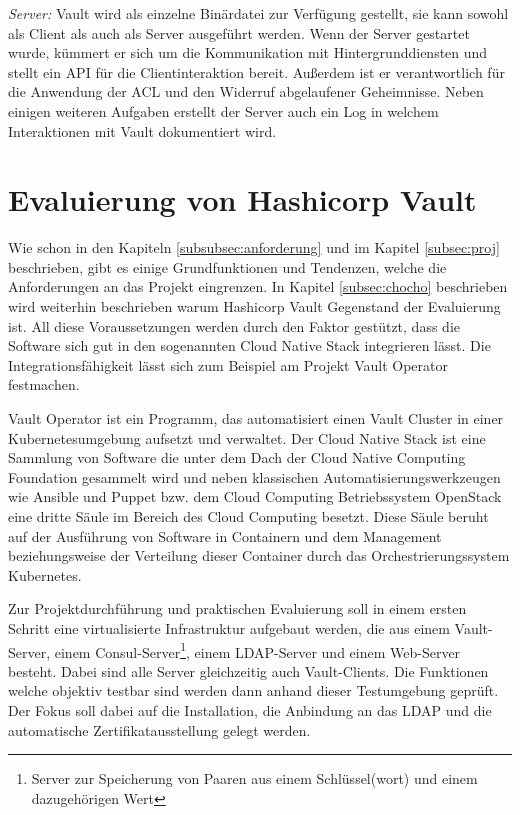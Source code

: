 \documentclass[
book,
a4paper,   
titlepage,  
halfparskip,
12pt        
]{scrartcl}
\begin{document}
\begin{onehalfspacing}
\textit{Server:} Vault wird als einzelne Binärdatei zur Verfügung gestellt, sie kann sowohl als Client als auch als Server ausgeführt werden. Wenn der Server gestartet wurde, kümmert er sich um die Kommunikation mit Hintergrunddiensten und stellt ein \ac{API} für die Clientinteraktion bereit. Außerdem ist er verantwortlich für die Anwendung der \ac{ACL} und den Widerruf abgelaufener Geheimnisse. Neben einigen weiteren Aufgaben erstellt der Server auch ein Log in welchem Interaktionen mit Vault dokumentiert wird.

\newpage
\section{Evaluierung von Hashicorp Vault}
 
\label{subsec:anf}
Wie schon in den Kapiteln \vref{subsubsec:anforderung} und im Kapitel \vref{subsec:proj} beschrieben, gibt es einige Grundfunktionen und Tendenzen, welche die Anforderungen an das Projekt eingrenzen. In Kapitel \vref{subsec:chocho} beschrieben wird weiterhin beschrieben warum Hashicorp Vault Gegenstand der Evaluierung ist. All diese Voraussetzungen werden durch den Faktor gestützt, dass die Software sich gut in den sogenannten Cloud Native Stack integrieren lässt\cite{cncf}. Die Integrationsfähigkeit lässt sich zum Beispiel am Projekt Vault Operator festmachen\cite{operator}.

Vault Operator ist ein Programm, das automatisiert einen Vault Cluster in einer Kubernetesumgebung aufsetzt und verwaltet. Der Cloud Native Stack ist eine Sammlung von Software die unter dem Dach der Cloud Native Computing Foundation gesammelt wird und neben klassischen Automatisierungswerkzeugen wie Ansible und Puppet bzw. dem Cloud Computing Betriebssystem OpenStack eine dritte Säule im Bereich des Cloud Computing besetzt. Diese Säule beruht auf der Ausführung von Software in Containern und dem Management beziehungsweise der Verteilung dieser Container durch das Orchestrierungssystem Kubernetes.

Zur Projektdurchführung und praktischen Evaluierung soll in einem ersten Schritt eine virtualisierte Infrastruktur aufgebaut werden, die aus einem Vault-Server, einem Consul-Server\footnote{Server zur Speicherung von Paaren aus einem Schlüssel(wort) und einem dazugehörigen Wert}, einem \acs{LDAP}-Server und einem Web-Server besteht. Dabei sind alle Server gleichzeitig auch Vault-Clients. Die Funktionen welche objektiv testbar sind werden dann anhand dieser Testumgebung geprüft. Der Fokus soll dabei auf die Installation,  die Anbindung an das \ac{LDAP} und die automatische Zertifikatausstellung gelegt werden.


\end{onehalfspacing}
\end{document}
